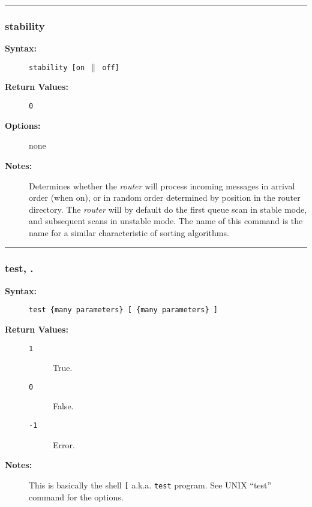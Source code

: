 \hrule
\subsubsection{stability}

\begin{description}
\item[{\bf Syntax:}] \mbox{}

{\tt stability [on $\|$ off]}

\item[{\bf Return Values:}] \mbox{}

\begin{description}
\item[{\tt 0}] \mbox{}



\end{description}


\item[{\bf Options:}] \mbox{}

none  

\item[{\bf Notes:}] \mbox{}

Determines whether the {\em router\/} will 
process incoming messages in arrival order (when on), or in random 
order determined by position in the router directory. The {\em router\/} 
will by default do the first queue scan in stable mode, and subsequent 
scans in unstable mode. The name of this command is the name for a 
similar characteristic of sorting algorithms. 

\end{description}


\hrule
\subsubsection{test, .}

\begin{description}
\item[{\bf Syntax:}] \mbox{}

{\tt test \{many parameters\} {[} \{many parameters\} {]}}

\item[{\bf Return Values:}] \mbox{}

\begin{description}
\item[{\tt 1}] \mbox{}

True.

\item[{\tt 0}] \mbox{}

False.

\item[{\tt -1}] \mbox{}

Error.

\end{description}


\item[{\bf Notes:}] \mbox{}

This is basically the shell {\tt {[}} a.k.a. 
{\tt test} program. See UNIX ``test'' command for the options.

\end{description}

